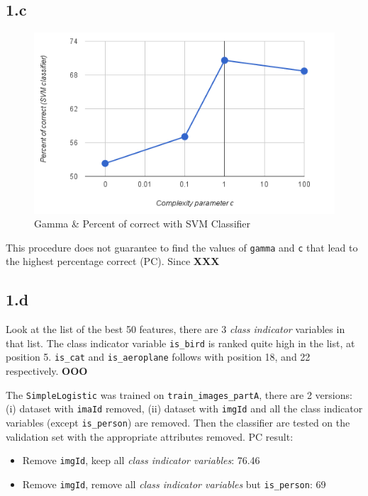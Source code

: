 \documentclass[12pt,journal,compsoc]{IEEEtran}
\begin{document}
\subsection*{1.c}
\begin{figure}
\label{complexity_chart}
\caption{Gamma \& Percent of correct with SVM Classifier}
\includegraphics[scale=0.6]{complexity_accuracy}
\end{figure}

This procedure does not guarantee to find the values of \texttt{gamma} and \texttt{c} that lead to the highest percentage correct (PC). Since \textbf{XXX}

\subsection*{1.d}
Look at the list of the best 50 features, there are 3 \textit{class indicator} variables in that list. The class indicator variable \texttt{is\_bird} is ranked quite high in the list, at position 5. \texttt{is\_cat} and \texttt{is\_aeroplane} follows with position 18, and 22 respectively. \textbf{OOO}

The \texttt{SimpleLogistic} was trained on \texttt{train\_images\_partA}, there are 2 versions: (i) dataset with \texttt{imaId} removed, (ii) dataset with \texttt{imgId} and all the class indicator variables (except \texttt{is\_person}) are removed. Then the classifier are tested on the validation set with the appropriate attributes removed. PC result:

\begin{itemize}
\item Remove \texttt{imgId}, keep all \textit{class indicator variables}: 76.46%
\item Remove \texttt{imgId}, remove all \textit{class indicator variables} but \texttt{is\_person}: 69%
\end{itemize}
\end{document}
